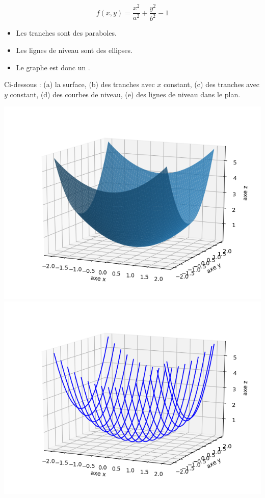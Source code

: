 \documentclass[11pt, class=report,crop=false]{standalone}
\begin{document}
\begin{exemple}
$$f(x,y) = \frac{x^2}{a^2} + \frac{y^2}{b^2}-1$$

\begin{itemize}
  \item Les tranches sont des paraboles.
  \item Les lignes de niveau sont des ellipses.
  \item Le graphe est donc un .
\end{itemize}

Ci-dessous : (a) la surface, (b) des tranches avec $x$ constant, (c) des tranches avec $y$ constant, (d) des courbes de niveau, (e) des lignes de niveau dans le plan.

\begin{center}
    \includegraphics[scale=\myscale,scale=0.5]{figures/fonctions-quadra-1a}
    \includegraphics[scale=\myscale,scale=0.5]{figures/fonctions-quadra-1b}

\end{center}
\end{exemple}
\end{document}

